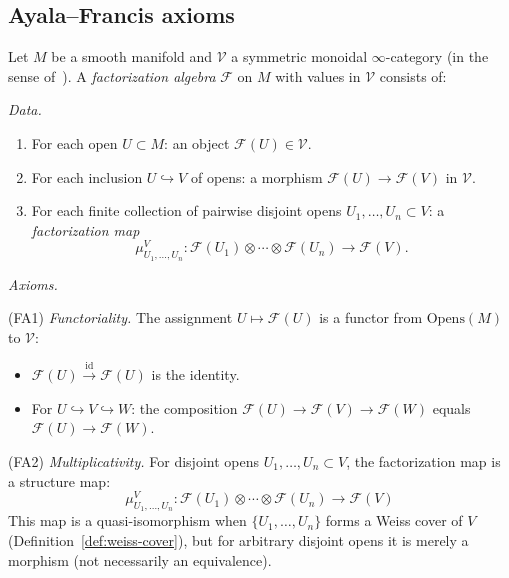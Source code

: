 \subsection{Ayala--Francis axioms}

\begin{definition}
\label{def:factorization-algebra-AF}
Let $M$ be a smooth manifold and $\mathcal{V}$ a symmetric monoidal $\infty$-category
(in the sense of~\cite[§2.0, §4.1]{HA}).
A \emph{factorization algebra} $\mathcal{F}$ on $M$ with values in $\mathcal{V}$
consists of:

\emph{Data.}
\begin{enumerate}
\item For each open $U \subset M$: an object $\mathcal{F}(U) \in \mathcal{V}$.

\item For each inclusion $U \hookrightarrow V$ of opens: a morphism
   $\mathcal{F}(U) \to \mathcal{F}(V)$ in $\mathcal{V}$.

\item For each finite collection of pairwise disjoint opens $U_1, \ldots, U_n \subset V$:
   a \emph{factorization map}
   \[\mu_{U_1,\ldots,U_n}^V: \mathcal{F}(U_1) \otimes \cdots \otimes \mathcal{F}(U_n)
      \to \mathcal{F}(V).\]
\end{enumerate}

\emph{Axioms.}

(FA1) \emph{Functoriality.} The assignment $U \mapsto \mathcal{F}(U)$ is a functor
from $\text{Opens}(M)$ to $\mathcal{V}$:
\begin{itemize}
\item $\mathcal{F}(U) \xrightarrow{\text{id}} \mathcal{F}(U)$ is the identity.
\item For $U \hookrightarrow V \hookrightarrow W$: the composition
   $\mathcal{F}(U) \to \mathcal{F}(V) \to \mathcal{F}(W)$ equals
   $\mathcal{F}(U) \to \mathcal{F}(W)$.
\end{itemize}

(FA2) \emph{Multiplicativity.} For disjoint opens $U_1, \ldots, U_n \subset V$,
the factorization map is a structure map:
\[\mu_{U_1,\ldots,U_n}^V: \mathcal{F}(U_1) \otimes \cdots \otimes \mathcal{F}(U_n)
   \longrightarrow \mathcal{F}(V)\]
This map is a quasi-isomorphism when $\{U_1, \ldots, U_n\}$ forms a
Weiss cover of $V$ (Definition~\ref{def:weiss-cover}), but for arbitrary disjoint opens it is merely a morphism (not necessarily an equivalence).


\end{definition}

